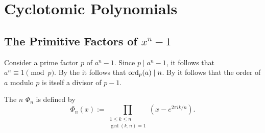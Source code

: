 \chapter{Cyclotomic Polynomials}

\section{The Primitive Factors of \texorpdfstring{$x^n-1$}{xⁿ-1}}

Consider a prime factor $p$ of $a^n-1$. Since $p\mid a^n-1$, it follows that $a^n\equiv 1\pmod{p}$. By the  it follows that $\operatorname{ord}_p(a)\mid n$. By  it follows that the order of $a$ modulo $p$ is itself a divisor of $p-1$.

\begin{definition}
  The $n$\supth{}  $\Phi_n$ is defined by
  \begin{equation*}
    \Phi_n(x) := \prod_{\substack{1\leq k \leq n\\[2pt]\gcd(k,n)=1}}(x-e^{2\pi ik/n}).
  \end{equation*}
\end{definition}


